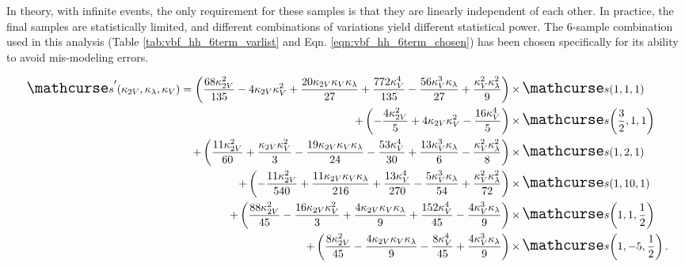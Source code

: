     In theory, with infinite events, the only requirement for these samples is that they are linearly independent of each other.
    In practice, the final samples are statistically limited, and different combinations of variations yield different statistical power.
    The 6-sample combination used in this analysis (Table \ref{tab:vbf_hh_6term_varlist} and Eqn. \ref{eqn:vbf_hh_6term_chosen}) has been chosen specifically for its ability to avoid mis-modeling errors.

    {\footnotesize \begin{equation}
    \label{eqn:vbf_hh_6term_chosen}
    \begin{split}
        \xsec'(\kvv, \kl, \kv) =
        \left(\frac{68 \kappa_{2V}^{2}}{135} - 4 \kappa_{2V} \kappa_{V}^{2} + \frac{20 \kappa_{2V} \kappa_{V} \kappa_{\lambda}}{27} + \frac{772 \kappa_{V}^{4}}{135} - \frac{56 \kappa_{V}^{3} \kappa_{\lambda}}{27} + \frac{\kappa_{V}^{2} \kappa_{\lambda}^{2}}{9}\right)
            \times & \xsec{\left(1,1,1 \right)} \\
        + \left(- \frac{4 \kappa_{2V}^{2}}{5} + 4 \kappa_{2V} \kappa_{V}^{2} - \frac{16 \kappa_{V}^{4}}{5}\right)
            \times & \xsec{\left(\frac{3}{2},1,1 \right)} \\
        + \left(\frac{11 \kappa_{2V}^{2}}{60} + \frac{\kappa_{2V} \kappa_{V}^{2}}{3} - \frac{19 \kappa_{2V} \kappa_{V} \kappa_{\lambda}}{24} - \frac{53 \kappa_{V}^{4}}{30} + \frac{13 \kappa_{V}^{3} \kappa_{\lambda}}{6} - \frac{\kappa_{V}^{2} \kappa_{\lambda}^{2}}{8}\right)
            \times & \xsec{\left(1,2,1 \right)} \\
        + \left(- \frac{11 \kappa_{2V}^{2}}{540} + \frac{11 \kappa_{2V} \kappa_{V} \kappa_{\lambda}}{216} + \frac{13 \kappa_{V}^{4}}{270} - \frac{5 \kappa_{V}^{3} \kappa_{\lambda}}{54} + \frac{\kappa_{V}^{2} \kappa_{\lambda}^{2}}{72}\right)
            \times & \xsec{\left(1,10,1 \right)}  \\
        + \left(\frac{88 \kappa_{2V}^{2}}{45} - \frac{16 \kappa_{2V} \kappa_{V}^{2}}{3} + \frac{4 \kappa_{2V} \kappa_{V} \kappa_{\lambda}}{9} + \frac{152 \kappa_{V}^{4}}{45} - \frac{4 \kappa_{V}^{3} \kappa_{\lambda}}{9}\right)
            \times & \xsec{\left(1,1,\frac{1}{2} \right)} \\
        + \left(\frac{8 \kappa_{2V}^{2}}{45} - \frac{4 \kappa_{2V} \kappa_{V} \kappa_{\lambda}}{9} - \frac{8 \kappa_{V}^{4}}{45} + \frac{4 \kappa_{V}^{3} \kappa_{\lambda}}{9}\right)
            \times & \xsec{\left(1,-5,\frac{1}{2} \right)}
        \,.
    \end{split} \end{equation}}

